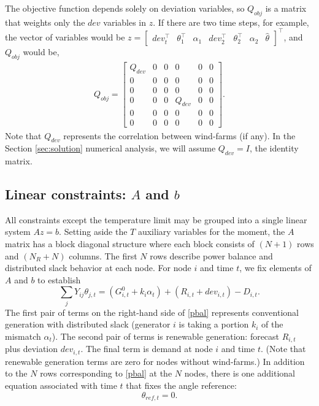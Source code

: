 \documentclass[conference]{IEEEtran}
\begin{document}
The objective function depends solely on deviation variables, so
$Q_{obj}$ is a matrix that weights only the $dev$ variables in $z$. If
there are two time steps, for example, the vector of variables would
be $z = \begin{bmatrix}dev_t^\top & \theta_1^\top & \alpha_1 &
  dev_2^\top & \theta_2^\top & \alpha_2 &
  \hat{\theta}\end{bmatrix}^\top$, and $Q_{obj}$ would be,
\begin{align*}
Q_{obj} = \begin{bmatrix} Q_{dev} & 0 & 0 & 0 & 0 & 0 \\ 0 & 0 & 0 & 0 & 0 & 0 \\ 0 & 0  & 0 & 0 & 0 & 0 \\ 0 & 0 & 0 & Q_{dev} & 0 & 0 \\ 0 & 0 & 0 & 0 & 0 & 0 \\ 0 & 0 & 0 & 0 & 0 & 0\end{bmatrix}.
\end{align*}
Note that $Q_{dev}$ represents the correlation between wind-farms (if any). In the Section \ref{sec:solution} numerical analysis, we will assume $Q_{dev}=I$, the identity matrix.

\subsection{Linear constraints: $A$ and $b$}\label{sec:Ax=b}

All constraints except the temperature limit may be grouped into a single linear system $Az=b$. Setting aside the $T$ auxiliary variables for the moment, the $A$ matrix has a block diagonal structure where each block consists of $(N+1)$ rows and $(N_R+N)$ columns. The first $N$ rows describe power balance and distributed slack behavior at each node. For node $i$ and time $t$, we fix elements of $A$ and $b$ to establish
\begin{equation}\label{pbal}
\sum\limits_{j} Y_{ij}\theta_{j,t}  = (G_{i,t}^0 + k_i\alpha_t) +
(R_{i,t} + dev_{i,t}) - D_{i,t}.
\end{equation}
The first pair of terms on the right-hand side of \eqref{pbal}
represents conventional generation with distributed slack (generator
$i$ is taking a portion $k_i$ of the mismatch $\alpha_t$). The second
pair of terms is renewable generation: forecast $R_{i,t}$ plus
deviation $dev_{i,t}$. The final term is demand at node $i$ and time
$t$. (Note that renewable generation terms are zero for nodes without
wind-farms.) In addition to the $N$ rows corresponding to \eqref{pbal}
at the $N$ nodes, there is one additional equation associated with
time $t$ that fixes the angle reference:
\begin{equation}\label{mismatch}
\theta_{ref,t} = 0.
\end{equation}
\end{document}
